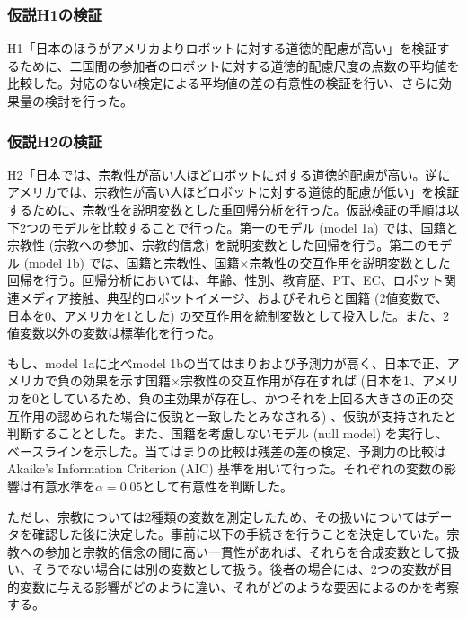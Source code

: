 \documentclass[a4j,12pt]{jreport}
\begin{document}
\subsubsection{仮説H1の検証}
H1「日本のほうがアメリカよりロボットに対する道徳的配慮が高い」を検証するために、二国間の参加者のロボットに対する道徳的配慮尺度の点数の平均値を比較した。対応のない$t$検定による平均値の差の有意性の検証を行い、さらに効果量の検討を行った。

\subsubsection{仮説H2の検証}
H2「日本では、宗教性が高い人ほどロボットに対する道徳的配慮が高い。逆にアメリカでは、宗教性が高い人ほどロボットに対する道徳的配慮が低い」を検証するために、宗教性を説明変数とした重回帰分析を行った。仮説検証の手順は以下2つのモデルを比較することで行った。第一のモデル (model 1a) では、国籍と宗教性 (宗教への参加、宗教的信念) を説明変数とした回帰を行う。第二のモデル (model 1b) では、国籍と宗教性、国籍×宗教性の交互作用を説明変数とした回帰を行う。回帰分析においては、年齢、性別、教育歴、PT、EC、ロボット関連メディア接触、典型的ロボットイメージ、およびそれらと国籍 (2値変数で、日本を0、アメリカを1とした) の交互作用を統制変数として投入した。また、2値変数以外の変数は標準化を行った。



もし、model 1aに比べmodel 1bの当てはまりおよび予測力が高く、日本で正、アメリカで負の効果を示す国籍×宗教性の交互作用が存在すれば (日本を1、アメリカを0としているため、負の主効果が存在し、かつそれを上回る大きさの正の交互作用の認められた場合に仮説と一致したとみなされる) 、仮説が支持されたと判断することとした。また、国籍を考慮しないモデル (null model) を実行し、ベースラインを示した。当てはまりの比較は残差の差の検定、予測力の比較はAkaike's Information Criterion (AIC) 基準を用いて行った。それぞれの変数の影響は有意水準を$\alpha=0.05$として有意性を判断した。



ただし、宗教については2種類の変数を測定したため、その扱いについてはデータを確認した後に決定した。事前に以下の手続きを行うことを決定していた。宗教への参加と宗教的信念の間に高い一貫性があれば、それらを合成変数として扱い、そうでない場合には別の変数として扱う。後者の場合には、2つの変数が目的変数に与える影響がどのように違い、それがどのような要因によるのかを考察する。
\end{document}
